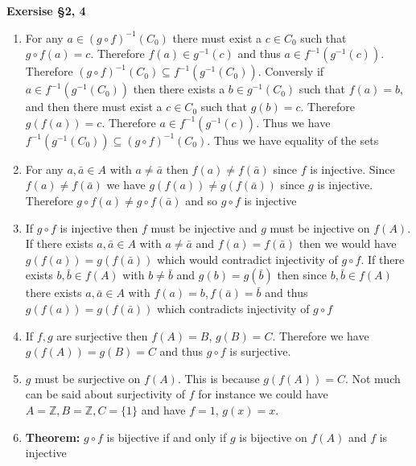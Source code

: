 \documentclass[12pt]{article}
\newenvironment{ques}[1]{\textbf{Exersise #1}\vspace{1 mm}\\ }{\bigskip}
\theoremstyle{definition}
\begin{document}
\begin{ques}{\S 2, 4}
	\begin{enumerate}
		\item
			For any $a \in (g \circ f)^{-1}(C_0)$ there must exist
			a $c \in C_0$ such that $g \circ f (a) = c$. Therefore
			$f(a) \in g^{-1}(c)$ and thus $a \in
			f^{-1}(g^{-1}(c))$. Therefore $(g \circ f)^{-1}(C_0)
			\subseteq f^{-1}(g^{-1}(C_0))$. Conversly if $a \in
			f^{-1}(g^{-1}(C_0))$ then there exists a $b \in
			g^{-1}(C_0)$ such that $f(a) = b$, and then there must
			exist a $c \in C_0$ such that $g(b) = c$. Therefore
			$g(f(a)) = c$. Therefore $a \in f^{-1}(g^{-1}(c))$.
			Thus we have $f^{-1}(g^{-1}(C_0)) \subseteq (g \circ
			f)^{-1}(C_0)$. Thus we have equality of the sets

		\item
			For any $a, \bar a \in A$ with $a \neq \bar a$
			then $f(a) \neq f(\bar a)$ since $f$ is injective.
			Since  $f(a) \neq f(\bar a)$ we have $g(f(a)) \neq
			g(f(\bar a))$ since $g$ is injective. Therefore $g
			\circ f (a) \neq g \circ f (\bar a)$ and so $g \circ f$
			is injective

		\item
			If $g \circ f$ is injective then $f$ must be injective and $g$ must
			be injective on $f(A)$. If there exists $a, \bar a \in A$ with $a
			\neq \bar a$ and $f(a) = f(\bar a)$ then we would have
			$g(f(a)) = g(f(\bar a))$ which would contradict
			injectivity of $g \circ f$. If there exists $b, \bar b
			\in f(A)$ with $b \neq \bar b$ and $g(b) = g(\bar b)$
			then since $b, \bar b \in f(A)$ there exists $a, \bar a
			\in A$ with $f(a) = b, f(\bar a) = \bar b$ and thus
			$g(f(a)) = g(f(\bar a))$ which contradicts injectivity
			of $g \circ f$

		\item
			If $f, g$ are surjective then $f(A) = B$, $g(B) = C$.
			Therefore we have $g(f(A)) = g(B) = C$ and thus $g
			\circ f$ is surjective.
		\item
			$g$ must be surjective on $f(A)$. This is because
			$g(f(A)) = C$. Not much can be said about surjectivity
			of $f$ for instance we could have $A = \mathbb Z, B =
			\mathbb Z, C = \{1\}$ and have $f = 1$, $g(x) = x$.

		\item
			\textbf{Theorem: } $g \circ f$ is bijective if and only
			if $g$ is bijective on $f(A)$ and $f$ is injective

	\end{enumerate}
\end{ques}
\end{document}
